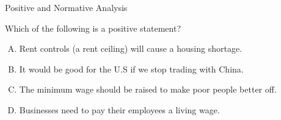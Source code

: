 \documentclass{beamer}
\begin{document}
\begin{frame}{Positive and Normative Analysis}
  \bigskip

  Which of the following is a positive statement?

  \bigskip
  \begin{enumerate}[A)]
        \item \alert{Rent controls (a rent ceiling) will cause a housing shortage.}
    \item It would be good for the U.S if we stop trading with China.
    \item The minimum wage should be raised to make poor people better off.
    \item Businesses need to pay their employees a living wage.
  \end{enumerate}
\end{frame}
\end{document}
